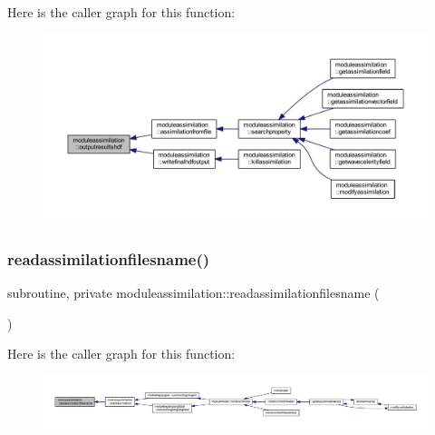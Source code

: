 Here is the caller graph for this function\+:\nopagebreak
\begin{figure}[H]
\begin{center}
\leavevmode
\includegraphics[width=350pt]{namespacemoduleassimilation_a48b30161fd16a556f8e54eeaf6b054e3_icgraph}
\end{center}
\end{figure}
\mbox{\label{namespacemoduleassimilation_a7409230e777bc5f92a43eb6fe78da6b9}} 
\subsubsection{\texorpdfstring{readassimilationfilesname()}{readassimilationfilesname()}}
{\footnotesize\ttfamily subroutine, private moduleassimilation\+::readassimilationfilesname (\begin{DoxyParamCaption}{ }\end{DoxyParamCaption})\hspace{0.3cm}{\ttfamily [private]}}

Here is the caller graph for this function\+:\nopagebreak
\begin{figure}[H]
\begin{center}
\leavevmode
\includegraphics[width=350pt]{namespacemoduleassimilation_a7409230e777bc5f92a43eb6fe78da6b9_icgraph}
\end{center}
\end{figure}
\mbox{\label{namespacemoduleassimilation_ad7f96fa745bdccdc0281d15675836a9b}} 
